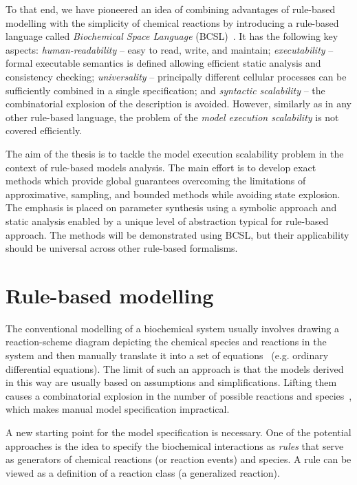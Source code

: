 \documentclass[11pt,a4paper]{report}
\begin{document}
To that end, we have pioneered an idea of combining advantages of rule-based modelling with the simplicity of chemical reactions by introducing a rule-based language called \emph{Biochemical Space Language} (BCSL)~\cite{dved2016formal}. It has the following key aspects: \emph{human-readability} -- easy to read, write, and maintain;
\emph{executability} -- formal executable semantics is defined allowing efficient static analysis and consistency checking; \emph{universality} -- principally different cellular processes can be sufficiently combined in a single specification; and \emph{syntactic scalability} -- the combinatorial explosion of the description is avoided. However, similarly as in any other rule-based language, the problem of the \emph{model execution scalability} is not covered efficiently.

The aim of the thesis is to tackle the model execution scalability problem in the context of rule-based models analysis. The main effort is to develop exact methods which provide global guarantees overcoming the limitations of approximative, sampling, and bounded methods while avoiding state explosion. The emphasis is placed on parameter synthesis using a symbolic approach and static analysis enabled by a unique level of abstraction typical for rule-based approach. The methods will be demonstrated using BCSL, but their applicability should be universal across other rule-based formalisms.

\chapter{Rule-based modelling}
\label{formal}

The conventional modelling of a biochemical system usually involves drawing a reaction-scheme diagram depicting the chemical species and reactions in the system and then manually translate it into a set of equations~\cite{voit2000computational} (e.g. ordinary differential equations). The limit of such an approach is that the models derived in this way are usually based on assumptions and simplifications. Lifting them causes a combinatorial explosion in the number of possible reactions and species~\cite{blinov2006network}, which makes manual model specification impractical.

A new starting point for the model specification is necessary. One of the potential approaches is the idea to specify the biochemical interactions as \emph{rules} that serve as generators of chemical reactions (or reaction events) and species. A rule can be viewed as a definition of a reaction class (a generalized reaction).
\end{document}
